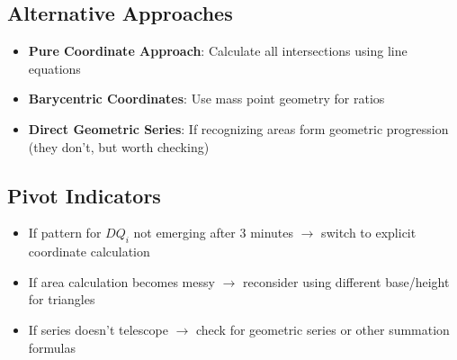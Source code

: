\documentclass[]{article}
\begin{document}
\begin{solutionbox}
\subsection*{Alternative Approaches}
\begin{itemize}
    \item \textbf{Pure Coordinate Approach}: Calculate all intersections using line equations
    \item \textbf{Barycentric Coordinates}: Use mass point geometry for ratios
    \item \textbf{Direct Geometric Series}: If recognizing areas form geometric progression (they don't, but worth checking)
\end{itemize}

\subsection*{Pivot Indicators}
\begin{itemize}
    \item If pattern for $DQ_i$ not emerging after 3 minutes $\rightarrow$ switch to explicit coordinate calculation
    \item If area calculation becomes messy $\rightarrow$ reconsider using different base/height for triangles
    \item If series doesn't telescope $\rightarrow$ check for geometric series or other summation formulas
\end{itemize}
\end{solutionbox}
\end{document}
